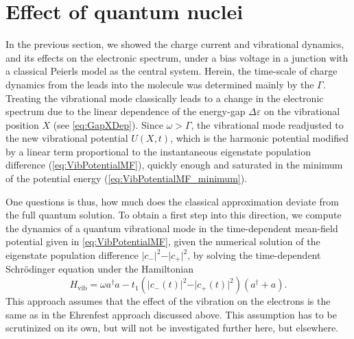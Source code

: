 \documentclass{article}
\begin{document}
\section{Effect of quantum nuclei}
In the previous section, we showed the charge current and vibrational dynamics, and its effects on the electronic spectrum, under a bias voltage in a junction with a classical Peierls model as the central system. Herein, the time-scale of charge dynamics from the leads into the molecule was determined mainly by the $\Gamma$. Treating the vibrational mode classically leads to a change in the electronic spectrum due to the linear dependence of the energy-gap $\Delta \varepsilon$ on the vibrational position $X$ (see \cref{eq:GapXDep}). Since $\omega>\Gamma$, the vibrational mode readjusted to the new vibrational potential $U(X,t)$, which is the harmonic potential modified by a linear term proportional to the instantaneous eigenstate population difference (\cref{eq:VibPotentialMF}), quickly enough and saturated in the minimum of the potential energy (\cref{eq:VibPotentialMF_minimum}). 

One questions is thus, how much does the classical approximation deviate from the full quantum solution. To obtain a first step into this direction, we compute the dynamics of a quantum vibrational mode in the time-dependent mean-field potential given in \cref{eq:VibPotentialMF}, given the numerical solution of the eigenstate population difference $\vert c_-\vert^2 - \vert c_+\vert^2$, by solving the time-dependent Schrödinger equation under the Hamiltonian
\begin{equation}
	H_\mathrm{vib} = \omega a^\dagger a - t_1 (\vert c_-(t)\vert^2 - \vert c_+(t)\vert^2) (a^\dagger + a).
\end{equation} 
This approach assumes that the effect of the vibration on the electrons is the same as in the Ehrenfest approach discussed above. This assumption has to be scrutinized on its own, but will not be investigated further here, but elsewhere.
\end{document}
